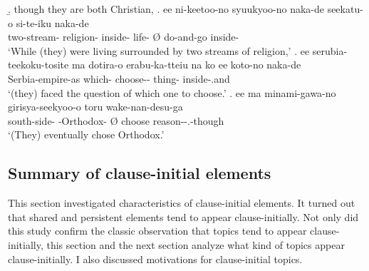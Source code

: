  \b. though they are both Christian,
 \bg. ee ni-keetoo-no syuukyoo-no naka-de seekatu-o \EM{\O} si-te-iku naka-de \\
 		 two-stream- religion- inside- life- {\O} do-and-go inside- \\
		`While (they) were living surrounded by two streams of religion,'
 \bg. ee serubia-teekoku-tosite ma dotira-o erabu-ka-tteiu na ko ee koto-no naka-de \\
 	 Serbia-empire-as  which- choose--    thing- inside-.and \\
	`(they) faced the question of which one to choose.'
 \bg. ee ma minami-gawa-no girisya-seekyoo-o \EM{\O} toru wake-nan-desu-ga \\
 	  south-side- -Orthodox- {\O} choose reason--.-though \\
	`(They) eventually chose  Orthodox.'


\subsection{Summary of clause-initial elements}

This section investigated characteristics of clause-initial elements.
It turned out that
shared and persistent elements tend to appear clause-initially.
Not only did this study confirm the classic observation that
topics tend to appear clause-initially,
this section and the next section analyze what kind of topics appear clause-initially.
I also discussed motivations for clause-initial topics.


